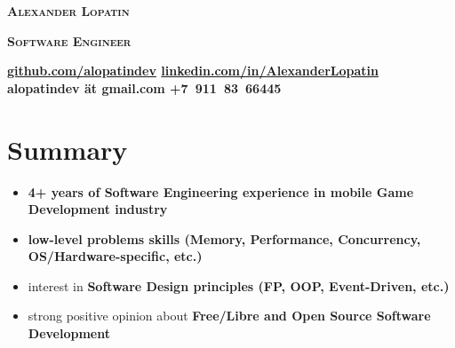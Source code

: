\begin{center}
\fontsize{23pt}{15pt}\selectfont
\textsc{\lsstyle\bfseries Alexander Lopatin\mdseries}

\vspace{15pt}

\fontsize{18pt}{10pt}\selectfont
\textsc{\bfseries Software Engineer\mdseries}

\vspace{6pt}


\horizline

\vspace{0.1cm}

{
\bfseries
\fontsize{8pt}{8pt}\selectfont
\faGithub\hspace{0.1cm}\href{https://github.com/alopatindev?tab=repositories}{github.com/alopatindev}
\contactDelimiter\faLinkedinSquare\hspace{0.1cm}\href{https://www.linkedin.com/in/AlexanderLopatin}{linkedin.com/in/AlexanderLopatin}
\contactDelimiter\faEnvelope\hspace{0.1cm}alopatindev ät gmail.com
\contactDelimiter\faMobilePhone\hspace{0.1cm}+7~911~83~66445
\mdseries
}

\end{center}

\fontsize{11pt}{11.6pt}\selectfont

\section*{Summary}

\begin{itemize}[rightmargin=\dimexpr\linewidth-18cm-\leftmargin\relax]
    \item \bfseries 4+ years \mdseries of Software Engineering experience in mobile Game Development industry
    \item \bfseries low-level problems \mdseries skills (Memory, Performance, Concurrency, OS/Hardware-specific, etc.)
    \item interest in \bfseries Software Design \mdseries principles (FP, OOP, Event-Driven, etc.)
    \item strong positive opinion about \bfseries Free/Libre and Open Source \mdseries Software Development
\end{itemize}

